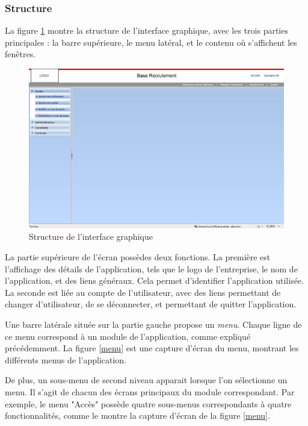 
\subsubsection{Structure}

La figure \ref{structure} montre la structure de l'interface graphique, avec les trois parties principales : la barre supérieure, le menu latéral, et le contenu où s'affichent les fenêtres.
\begin{figure}[!h]
	\center
	\includegraphics[width=1\textwidth]{img/structure.png}
	\caption{Structure de l'interface graphique}
	\label{structure}
\end{figure}



La partie supérieure de l'écran possèdes deux fonctions.
La première est l'affichage des détails de l'application, tels que le logo de l'entreprise, le nom de l'application, et des liens généraux.
Cela permet d'identifier l'application utilisée.
La seconde est liée au compte de l'utilisateur, avec des liens permettant de changer d'utilisateur, de se déconnecter, et permettant de quitter l'application.



Une barre latérale située sur la partie gauche propose un \textit{menu}.
Chaque ligne de ce menu correspond à un module de l'application, comme expliqué précédemment.
La figure \ref{menu} est une capture d'écran du menu, montrant les différents menus de l'application.

De plus, un sous-menu de second niveau apparait lorsque l'on sélectionne un menu.
Il s'agit de chacun des écrans principaux du module correspondant.
Par exemple, le menu "Accès" possède quatre sous-menus correspondants à quatre fonctionnalités, comme le montre la capture d'écran de la figure \ref{menu}.

